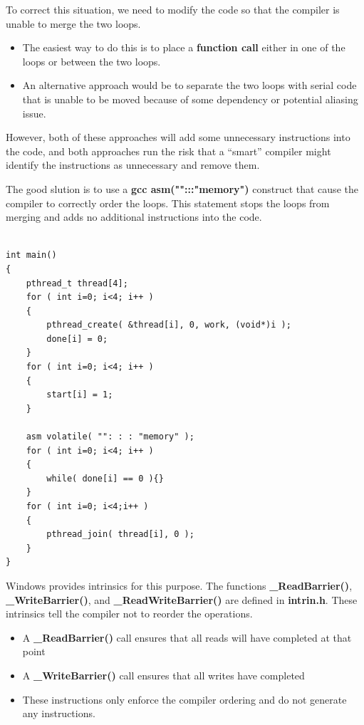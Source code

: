 \documentclass[12pt,a4paper]{report}
\begin{document}
To correct this situation, we need to modify the code so that the compiler is unable to merge the two loops.
\begin{itemize}
	\item The easiest way to do this is to place a\textbf{ function call} either in one of the loops or between the two loops.
	\item An alternative approach would be to separate the two loops with serial code that is unable to be moved because of some dependency or potential aliasing issue.
\end{itemize}
However, both of these approaches will add some unnecessary instructions into the code, and both approaches run the risk that a ``smart'' compiler might identify the instructions as unnecessary and remove them.
\par
The good slution is to use a \textbf{gcc asm("":::"memory")} construct that cause the compiler to correctly order the loops. This statement stops the loops from merging and adds no additional instructions into the code.
\begin{lstlisting}

int main()
{
	pthread_t thread[4];
	for ( int i=0; i<4; i++ )
	{
		pthread_create( &thread[i], 0, work, (void*)i );
		done[i] = 0;
	}
	for ( int i=0; i<4; i++ )
	{
		start[i] = 1;
	}

	asm volatile( "": : : "memory" );
	for ( int i=0; i<4; i++ )
	{
		while( done[i] == 0 ){}
	}
	for ( int i=0; i<4;i++ )
	{
		pthread_join( thread[i], 0 );
	}
}

\end{lstlisting}
Windows provides intrinsics for this purpose. The functions \textbf{\_ReadBarrier()}, \textbf{\_WriteBarrier()}, and \textbf{\_ReadWriteBarrier()} are defined in \textbf{intrin.h}. These intrinsics tell the compiler not to reorder the operations.
\begin{itemize}
	\item A \textbf{\_ReadBarrier()} call ensures that all reads will have completed at that point
	\item A \textbf{\_WriteBarrier()} call ensures that all writes have completed
	\item These instructions only enforce the compiler ordering and do not generate any instructions.
\end{itemize}
\end{document}
